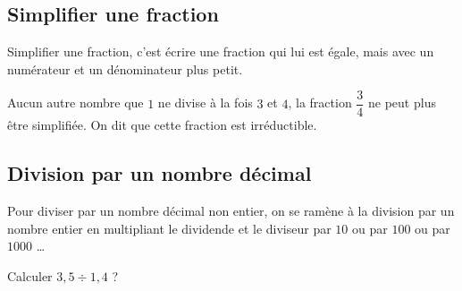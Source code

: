 \documentclass[a4paper,10pt]{report}
\begin{document}
\begin{ex}
\noindent\grandscarreaux{\linewidth}{4cm}
\end{ex}

\subsection{Simplifier une fraction}

\begin{defn}
Simplifier une fraction, c'est écrire une fraction qui lui est égale, mais avec un numérateur et un dénominateur plus petit.
\end{defn}

\begin{ex}
\noindent\grandscarreaux{\linewidth}{3.2cm}
\end{ex}

\begin{rem}
Aucun autre nombre que $1$ ne divise à la fois $3$ et $4$, la fraction $\dfrac{3}{4}$ ne peut plus être simplifiée. On dit que cette fraction est irréductible.
\end{rem}

\subsection{Division par un nombre décimal}

\begin{prop}
Pour diviser par un nombre décimal non entier, on se ramène à la division par un nombre entier en multipliant le dividende et le diviseur par $10$ ou par $100$ ou par $1000$ \dots
\end{prop}

\begin{ex}
Calculer $3,5 \div 1,4$ ?

\medskip
\noindent\grandscarreaux{\linewidth}{3.2cm}
\end{ex}
\end{document}
